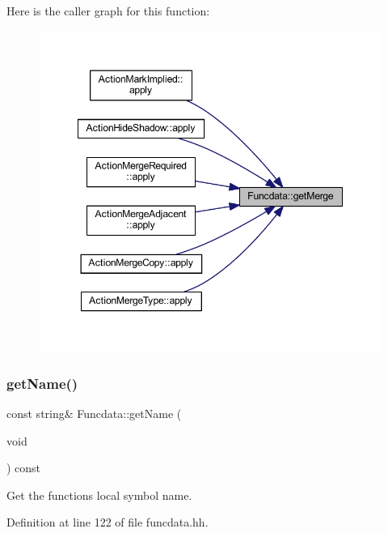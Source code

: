 Here is the caller graph for this function\+:
\nopagebreak
\begin{figure}[H]
\begin{center}
\leavevmode
\includegraphics[width=348pt]{class_funcdata_ad7716a2ee4e91b0b91ac0487264673ca_icgraph}
\end{center}
\end{figure}
\mbox{\label{class_funcdata_a8c6ed264ff7e018a4948045186e4af1f}} 
\subsubsection{\texorpdfstring{getName()}{getName()}}
{\footnotesize\ttfamily const string\& Funcdata\+::get\+Name (\begin{DoxyParamCaption}\item[{void}]{ }\end{DoxyParamCaption}) const\hspace{0.3cm}{\ttfamily [inline]}}



Get the function\textquotesingle{}s local symbol name. 



Definition at line 122 of file funcdata.\+hh.

